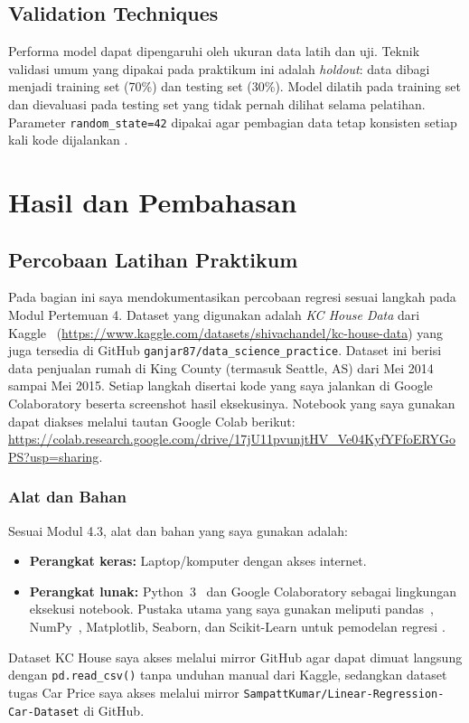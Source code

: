 \documentclass[a4paper,oneside,12pt]{report}
\newcommand{\tocboldsection}[1]{%
  \protect\renewcommand{\protect\cftchapfont}{\protect\bfseries}%
  #1%
  \protect\renewcommand{\protect\cftchapfont}{}%
}
\begin{document}
\section{Validation Techniques}
Performa model dapat dipengaruhi oleh ukuran data latih dan uji. Teknik validasi umum yang dipakai pada praktikum ini adalah \textit{holdout}: data dibagi menjadi training set (70\%) dan testing set (30\%). Model dilatih pada training set dan dievaluasi pada testing set yang tidak pernah dilihat selama pelatihan. Parameter \texttt{random\_state=42} dipakai agar pembagian data tetap konsisten setiap kali kode dijalankan \cite{han2022,dicoding-workflow,digitalskola-preprocessing}.

\clearpage

\chapter[\tocboldsection{Hasil dan Pembahasan}]{Hasil dan Pembahasan}

\section{Percobaan Latihan Praktikum}
Pada bagian ini saya mendokumentasikan percobaan regresi sesuai langkah pada Modul Pertemuan 4. Dataset yang digunakan adalah \textit{KC House Data} dari Kaggle~\cite{kaggle-kc} (\url{https://www.kaggle.com/datasets/shivachandel/kc-house-data}) yang juga tersedia di GitHub \texttt{ganjar87/data\_science\_practice}. Dataset ini berisi data penjualan rumah di King County (termasuk Seattle, AS) dari Mei 2014 sampai Mei 2015. Setiap langkah disertai kode yang saya jalankan di Google Colaboratory beserta screenshot hasil eksekusinya. Notebook yang saya gunakan dapat diakses melalui tautan Google Colab berikut: \url{https://colab.research.google.com/drive/17jU11pvunjtHV_Ve04KyfYFfoERYGoPS?usp=sharing}.

\subsection{Alat dan Bahan}
Sesuai Modul 4.3, alat dan bahan yang saya gunakan adalah:
\begin{itemize}
    \item \textbf{Perangkat keras:} Laptop/komputer dengan akses internet.
    \item \textbf{Perangkat lunak:} Python~3~\cite{python-docs} dan Google Colaboratory sebagai lingkungan eksekusi notebook. Pustaka utama yang saya gunakan meliputi pandas~\cite{pandas-docs}, NumPy~\cite{numpy-docs}, Matplotlib, Seaborn, dan Scikit-Learn untuk pemodelan regresi \cite{sklearn-metrics,sklearn-preprocessing}.
\end{itemize}
Dataset KC House saya akses melalui mirror GitHub agar dapat dimuat langsung dengan \texttt{pd.read\_csv()} tanpa unduhan manual dari Kaggle, sedangkan dataset tugas Car Price saya akses melalui mirror \texttt{SampattKumar/Linear-Regression-Car-Dataset} di GitHub.
\end{document}
